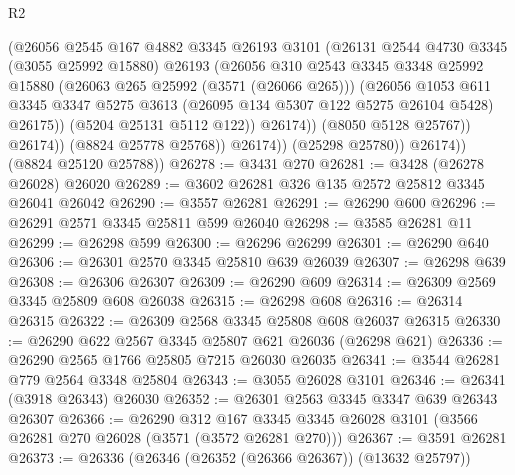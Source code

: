 \begin{lexlean}{R2}
\begin{coremodule}
                          (@26056
                            @2545
                            @167
                            @4882
                            @3345
                            @26193
                            @3101
                            (@26131
                              @2544
                              @4730
                              @3345
                              (@3055 @25992 @15880)
                              @26193
                              (@26056
                                @310
                                @2543
                                @3345
                                @3348
                                @25992
                                @15880
                                (@26063 @265 @25992 (@3571 (@26066 @265)))
                                (@26056
                                  @1053
                                  @611
                                  @3345
                                  @3347
                                  @5275
                                  @3613
                                  (@26095 @134 @5307 @122 @5275 @26104 @5428)
                                  @26175))
                              (@5204 @25131 @5112 @122))
                            @26174))
                        (@8050 @5128 @25767))
                      @26174))
                  (@8824 @25778 @25768))
                @26174))
            (@25298 @25780))
          @26174))
      (@8824 @25120 @25788))
@26278 := @3431 @270
@26281 := @3428 (@26278 @26028) @26020
@26289 := @3602 @26281 @326 @135 @2572 @25812 @3345 @26041 @26042
@26290 := @3557 @26281
@26291 := @26290 @600
@26296 := @26291 @2571 @3345 @25811 @599 @26040
@26298 := @3585 @26281 @11
@26299 := @26298 @599
@26300 := @26296 @26299
@26301 := @26290 @640
@26306 := @26301 @2570 @3345 @25810 @639 @26039
@26307 := @26298 @639
@26308 := @26306 @26307
@26309 := @26290 @609
@26314 := @26309 @2569 @3345 @25809 @608 @26038
@26315 := @26298 @608
@26316 := @26314 @26315
@26322 := @26309 @2568 @3345 @25808 @608 @26037 @26315
@26330 := @26290 @622 @2567 @3345 @25807 @621 @26036 (@26298 @621)
@26336 := @26290 @2565 @1766 @25805 @7215 @26030 @26035
@26341 := @3544 @26281 @779 @2564 @3348 @25804
@26343 := @3055 @26028 @3101
@26346 := @26341 (@3918 @26343) @26030
@26352 := @26301 @2563 @3345 @3347 @639 @26343 @26307
@26366 := @26290
    @312
    @167
    @3345
    @3345
    @26028
    @3101
    (@3566 @26281 @270 @26028 (@3571 (@3572 @26281 @270)))
@26367 := @3591 @26281
@26373 := @26336 (@26346 (@26352 (@26366 @26367)) (@13632 @25797))

\end{coremodule}
\end{lexlean}
